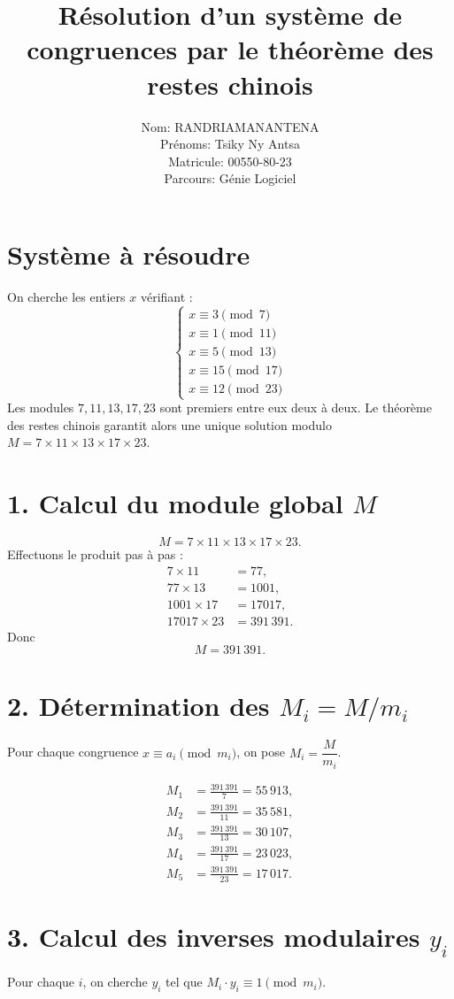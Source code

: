 \documentclass[12pt,a4paper]{article}
\title{Résolution d’un système de congruences par le théorème des restes chinois}
\author{Nom: RANDRIAMANANTENA \\
Prénoms: Tsiky Ny Antsa \\
Matricule: 00550-80-23 \\
Parcours: Génie Logiciel}
\date{}
\begin{document}
\maketitle

\section*{Système à résoudre}
On cherche les entiers $x$ vérifiant :
\[
\begin{cases}
x \equiv 3 \pmod{7} \\
x \equiv 1 \pmod{11} \\
x \equiv 5 \pmod{13} \\
x \equiv 15 \pmod{17} \\
x \equiv 12 \pmod{23}
\end{cases}
\]
Les modules $7, 11, 13, 17, 23$ sont premiers entre eux deux à deux. Le théorème des restes chinois garantit alors une unique solution modulo $M = 7 \times 11 \times 13 \times 17 \times 23$.

\section*{1. Calcul du module global $M$}
\[
M = 7 \times 11 \times 13 \times 17 \times 23.
\]
Effectuons le produit pas à pas :
\begin{align*}
7 \times 11 &= 77,\\
77 \times 13 &= 1001,\\
1001 \times 17 &= 17017,\\
17017 \times 23 &= 391\,391.
\end{align*}
Donc
\[
\boxed{M = 391\,391}.
\]

\section*{2. Détermination des $M_i = M / m_i$}
Pour chaque congruence $x \equiv a_i \pmod{m_i}$, on pose $M_i = \dfrac{M}{m_i}$.

\begin{align*}
M_1 &= \frac{391\,391}{7} = 55\,913, \\
M_2 &= \frac{391\,391}{11} = 35\,581, \\
M_3 &= \frac{391\,391}{13} = 30\,107, \\
M_4 &= \frac{391\,391}{17} = 23\,023, \\
M_5 &= \frac{391\,391}{23} = 17\,017.
\end{align*}

\section*{3. Calcul des inverses modulaires $y_i$}
Pour chaque $i$, on cherche $y_i$ tel que $M_i \cdot y_i \equiv 1 \pmod{m_i}$.
\end{document}
